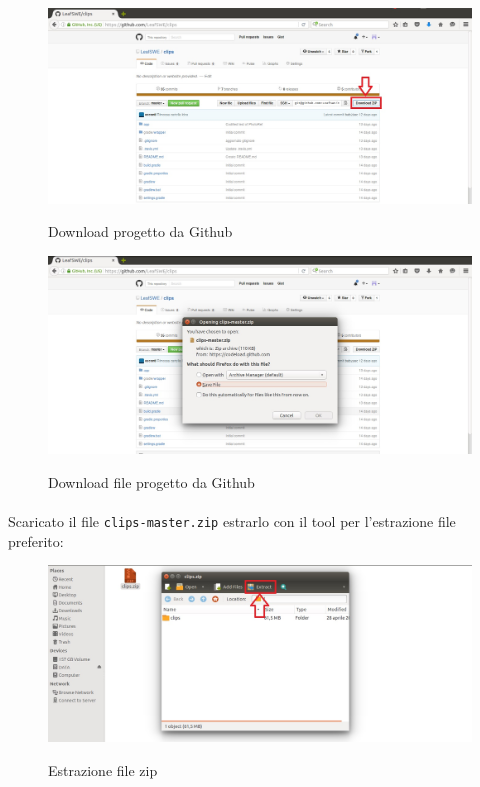 \documentclass[../ManualeSviluppatore.tex]{subfiles}
\begin{document}
			\begin{figure} [h]
				\centering
				\includegraphics[scale=0.34]{img/DownloadZip}
				\label{fig:DownloadZip}
				\caption{Download progetto da Github}
			\end{figure}
			
			\begin{figure} [h]
				\centering
				\includegraphics[width=\textwidth]{img/Download}
				\label{fig:DownloadZip2}
				\caption{Download file progetto da Github}
			\end{figure}
			
		\paragraph*{}
			Scaricato il file \verb|clips-master.zip| estrarlo con il tool per l'estrazione file preferito:
			
			\begin{figure} [h]
				\centering
				\includegraphics[width=\textwidth]{img/EstraiZip}
				\label{fig:EstraiZip}
				\caption{Estrazione file zip}
			\end{figure}
			
\end{document}
